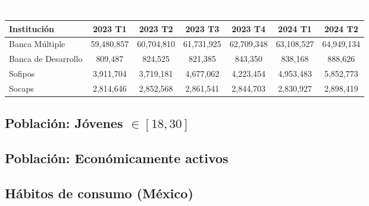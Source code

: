 \begin{table}[h!]
    \centering
    \caption{\textcolor{white}{Número total de créditos otorgados por tipo de institución (trimestral)}}
    \color{white}
    \begin{tabular}{lcccccc}
        \hline
        \textbf{Institución} & \textbf{2023 T1} & \textbf{2023 T2} & \textbf{2023 T3} & \textbf{2023 T4} & \textbf{2024 T1} & \textbf{2024 T2} \\
        \hline
        Banca Múltiple       &       59,480,857         &        60,704,810         &         61,731,925        &        62,709,348        &         63,108,527        &          64,949,134         \\
        Banca de Desarrollo  &       809,487        &        824,525         &         821,385         &         843,350         &         838,168        &           888,626         \\
        Sofipos              &        3,911,704          &          3,719,181       &         4,677,062          &         4,223,454        &        4,953,483         &           5,852,773       \\
        Socaps               &        2,814,646        &        2,852,568         &        2,861,541         &         2,844,703       &        2,830,927         &           2,898,419       \\
        \hline
    \end{tabular}
    \label{tab:total_creditos_trimestrales}
\end{table}


\subsection*{Población: Jóvenes $\in[18,30]$}

\subsection*{Población: Económicamente activos}

\subsection*{Hábitos de consumo (México)}